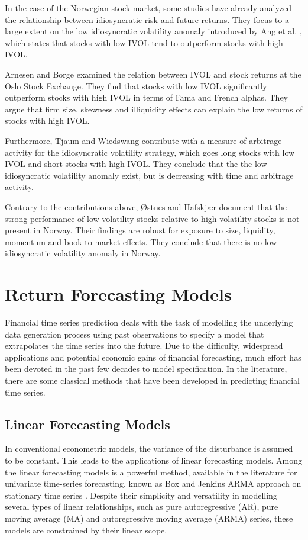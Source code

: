 In the case of the Norwegian stock market, some studies have already analyzed the relationship between idiosyncratic risk and future returns. They focus to a large extent on the low idiosyncratic volatility anomaly introduced by Ang et al. \cite{angetal06}, which states that stocks with low IVOL tend to outperform stocks with high IVOL. 

Arnesen and Borge \cite{arnborge} examined the relation between IVOL and stock returns at the Oslo Stock Exchange. They find that stocks with low IVOL significantly outperform stocks with high IVOL in terms of Fama and French \cite{famafrench} alphas. They argue that firm size, skewness and illiquidity effects can explain the low returns of stocks with high IVOL.

Furthermore, Tjaum and Wiedswang \cite{thaumwiedswang} contribute with a measure of arbitrage activity for the idiosyncratic volatility strategy, which goes long stocks with low IVOL and short stocks with high IVOL. They conclude that the the low idiosyncratic volatility anomaly exist, but is decreasing with time and arbitrage activity. 

Contrary to the contributions above, Østnes and Hafskjær \cite{ostnes} document that the strong performance of low volatility stocks relative to high volatility stocks is not present in Norway. Their findings are robust for exposure to size, liquidity, momentum and book-to-market effects. They conclude that there is no low idiosyncratic volatility anomaly in Norway.


\section{Return Forecasting Models}

Financial time series prediction deals with the task of modelling the underlying data generation process using past observations to specify a model that extrapolates the time series into the future. Due to the difficulty, widespread applications and potential economic gains of financial forecasting, much effort has been devoted in the past few decades to model specification. In the literature, there are some classical methods that have been developed in predicting financial time series. 

\subsection{Linear Forecasting Models}

In conventional econometric models, the variance of the disturbance is assumed to be constant. This leads to the applications of linear forecasting models. Among the linear forecasting models is a powerful method, available in the literature for univariate time-series forecasting, known as Box and Jenkins ARMA approach on stationary time series \cite{B&J}. Despite their simplicity and versatility in modelling several types of linear relationships, such as pure autoregressive (AR), pure moving average (MA) and autoregressive moving average (ARMA) series, these models are constrained by their linear scope. 

